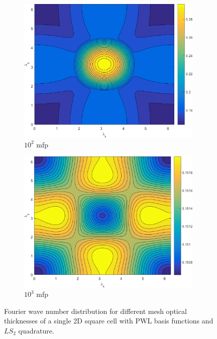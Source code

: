 \begin{figure}
{\begin{subfigure}[b]{0.485\textwidth}
		\centering
		\includegraphics[width=0.975\textwidth]{figures/sec_DSA/SI_MIP_C=4_UPWLD1_LS2_x=100_dydx=1_contour.png}
		\caption{$10^{2}$ mfp}
	\end{subfigure}
	\hfill
	\begin{subfigure}[b]{0.485\textwidth}
		\centering
		\includegraphics[width=0.975\textwidth]{figures/sec_DSA/SI_MIP_C=4_UPWLD1_LS2_x=1000_dydx=1_contour.png}
		\caption{$10^{3}$ mfp}
	\end{subfigure}
	}
\caption{Fourier wave number distribution for different mesh optical thicknesses of a single 2D square cell with PWL basis functions and $LS_{2}$ quadrature.}
\label{fig::2D_homo_dsa_wave_LS2}
\end{figure}

